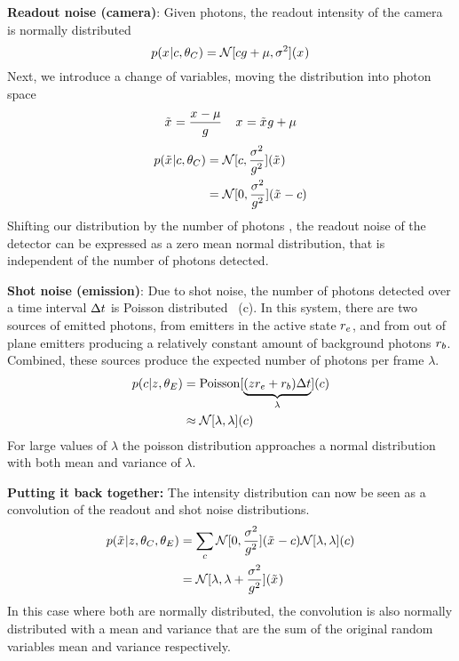 \textbf{Readout noise (camera)}:
  Given \photons photons, the readout intensity of the camera is normally distributed
  \begin{equation}
    p(x_{}|c,\theta_C) = \mathcal{N}[cg + \mu, \sigma^2](x_{})
  \end{equation}
  Next, we introduce a change of variables, moving the distribution into photon space
  \begin{equation}
    \tilde{x}_{} = \frac{x_{} - \mu}{g}
    \;\;\;\;
    x_{} = \tilde{x}_{}g + \mu
  \end{equation}
  \begin{align}
    p(\tilde{x}_{}|c,\theta_C)
      &= \mathcal{N}[c, \frac{\sigma^2}{g^2}](\tilde{x}_{}) \\
      &= \mathcal{N}[0, \frac{\sigma^2}{g^2}](\tilde{x}_{} - c)
  \end{align}
  Shifting our distribution by the number of photons \photons, the readout noise of the detector can be expressed as a zero mean 
  normal distribution, that is independent of the number of photons detected.


\textbf{Shot noise (emission)}:
  Due to shot noise, the number of photons detected over a time interval $\Delta t$ is Poisson
  distributed~\cite{mehta_poisson_2016} (c). 
  In this system, there are two sources of emitted photons, from emitters in the active state $r_e$,
  and from out of plane emitters producing a relatively constant amount of background photons $r_b$. Combined, 
  these sources produce the expected number of photons per frame $\lambda$. 
  \begin{align}
    p(c|z_{},\theta_E)
      &= \operatorname{Poisson}[\underbrace{(z_{}r_e + r_b)\Delta t}_{\lambda}](c) \\
      &\approx \mathcal{N}[\lambda, \lambda](c)
  \end{align}
  For large values of $\lambda$ the poisson distribution approaches a normal distribution with both mean and variance of $\lambda$.

\textbf{Putting it back together:}
The intensity distribution can now be seen as a convolution of the readout and shot noise distributions.
  \begin{align}
    p(\tilde{x}_{}|z_{},\theta_C, \theta_E)
      &= \sum_c
        \mathcal{N}[0, \frac{\sigma^2}{g^2}](\tilde{x}_{} - c)
        \mathcal{N}[\lambda, \lambda](c) \\
      &= \mathcal{N}[\lambda, \lambda + \frac{\sigma^2}{g^2}](\tilde{x}_{})
      \label{eq:method:approx_nomral}
  \end{align}
  In this case where both are normally distributed, the convolution is also normally distributed with 
  a mean and variance that are the sum of the original random variables mean and variance respectively. 

